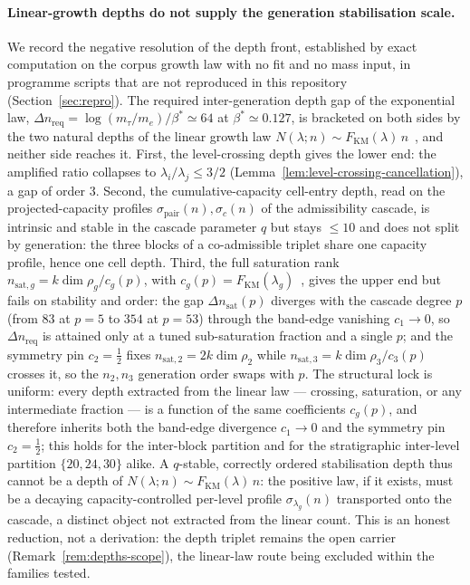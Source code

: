 \documentclass[11pt]{article}
\theoremstyle{definition}
\theoremstyle{remark}
\begin{document}
    \paragraph{Linear-growth depths do not supply the generation stabilisation scale.}
      We record the negative resolution of the depth front, established by exact computation on the corpus
      growth law with no fit and no mass input, in programme scripts that are not reproduced in this repository
      (Section~\ref{sec:repro}).
      The required inter-generation depth gap of the exponential law,
      \(\Delta n_{\mathrm{req}} = \log(m_\tau/m_e)/\beta^{\ast} \simeq 64\) at \(\beta^{\ast}\simeq 0.127\),
      is bracketed on both sides by the two natural depths of the linear growth law
      \(N(\lambda;n)\sim F_{\mathrm{KM}}(\lambda)\,n\)~\cite{Beau2026a5}, and neither side reaches it.
      First, the level-crossing depth gives the lower end:
      the amplified ratio collapses to \(\lambda_i/\lambda_j\le 3/2\)
      (Lemma~\ref{lem:level-crossing-cancellation}), a gap of order \(3\).
      Second, the cumulative-capacity cell-entry depth, read on the projected-capacity profiles
      \(\sigma_{\mathrm{pair}}(n),\sigma_c(n)\) of the admissibility cascade, is intrinsic and stable in the
      cascade parameter \(q\) but stays \(\le 10\) and does not split by generation:
      the three blocks of a co-admissible triplet share one capacity profile, hence one cell depth.
      Third, the full saturation rank \(n_{\mathrm{sat},g} = k\dim\rho_g/c_g(p)\), with
      \(c_g(p)=F_{\mathrm{KM}}(\lambda_g)\)~\cite{Beau2026a5}, gives the upper end but fails on stability and
      order:
      the gap \(\Delta n_{\mathrm{sat}}(p)\) diverges with the cascade degree \(p\)
      (from \(83\) at \(p=5\) to \(354\) at \(p=53\)) through the band-edge vanishing \(c_1\to 0\), so
      \(\Delta n_{\mathrm{req}}\) is attained only at a tuned sub-saturation fraction and a single \(p\);
      and the symmetry pin \(c_2=\tfrac12\) fixes \(n_{\mathrm{sat},2}=2k\dim\rho_2\) while
      \(n_{\mathrm{sat},3}=k\dim\rho_3/c_3(p)\) crosses it, so the \(n_2,n_3\) generation order swaps with
      \(p\).
      The structural lock is uniform:
      every depth extracted from the linear law --- crossing, saturation, or any intermediate fraction --- is
      a function of the same coefficients \(c_g(p)\), and therefore inherits both the band-edge divergence
      \(c_1\to 0\) and the symmetry pin \(c_2=\tfrac12\); this holds for the inter-block partition and for the
      stratigraphic inter-level partition \(\{20,24,30\}\) alike.
      A \(q\)-stable, correctly ordered stabilisation depth thus cannot be a depth of
      \(N(\lambda;n)\sim F_{\mathrm{KM}}(\lambda)\,n\):
      the positive law, if it exists, must be a decaying capacity-controlled per-level profile
      \(\sigma_{\lambda_g}(n)\) transported onto the cascade, a distinct object not extracted from the linear
      count.
      This is an honest reduction, not a derivation:
      the depth triplet remains the open carrier (Remark~\ref{rem:depths-scope}), the linear-law
      route being excluded within the families tested.
\end{document}
